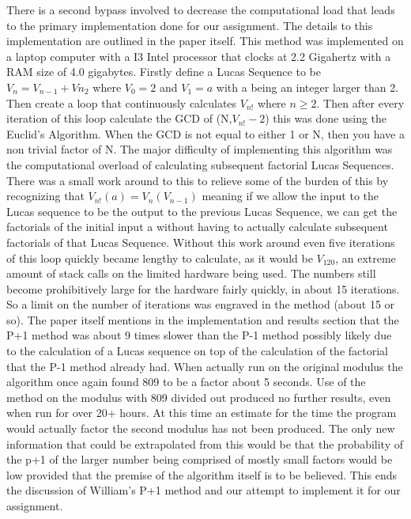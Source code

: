 \documentclass[12pt]{article} %
\begin{document}
	\indent There is a second bypass involved to decrease the computational load that leads to the primary implementation done for our assignment. The details to this implementation are outlined in the paper itself. This method was implemented on a laptop computer with a I3 Intel processor that clocks at 2.2 Gigahertz with a RAM size of 4.0 gigabytes. Firstly define a Lucas Sequence to be $V_n = V_{n-1}+V{n_2}$ where $V_0 = 2$ and $V_1 = a$ with a being an integer larger than 2. Then create a loop that continuously calculates $V_{n!}$ where $n \geq 2$. Then after every iteration of this loop calculate the GCD of (N,$V_{n!}-2$) this was done using the Euclid's Algorithm. When the GCD is not equal to either 1 or N, then you have a non trivial factor of N. The major difficulty of implementing this algorithm was the computational overload of calculating subsequent factorial Lucas Sequences. There was a small work around to this to relieve some of the burden of this by recognizing that $V_{n!}(a) = V_n({V_{n-1}})$ meaning if we allow the input to the Lucas sequence to be the output to the previous Lucas Sequence, we can get the factorials of the initial input a without having to actually calculate subsequent factorials of that Lucas Sequence. Without this work around even five iterations of this loop quickly became lengthy to calculate, as it would be $V_120$, an extreme amount of stack calls on the limited hardware being used. The numbers still become prohibitively large for the hardware fairly quickly, in about 15 iterations. So a limit on the number of iterations was engraved in the method (about 15 or so). The paper itself mentions in the implementation and results section that the P+1 method was about 9 times slower than the P-1 method possibly likely due to the calculation of a Lucas sequence on top of the calculation of the factorial that the P-1 method already had. When actually run on the original modulus the algorithm once again found 809 to be a factor about 5 seconds. Use of the method on the modulus with 809 divided out produced no further results, even when run for over 20+ hours. At this time an estimate for the time the program would actually factor the second modulus has not been produced. The only new information that could be extrapolated from this would be that the probability of the p+1 of the larger number being comprised of mostly small factors would be low provided that the premise of the algorithm itself is to be believed. This ends the discussion of William's P+1 method and our attempt to implement it for our assignment. 
	
\end{document}
